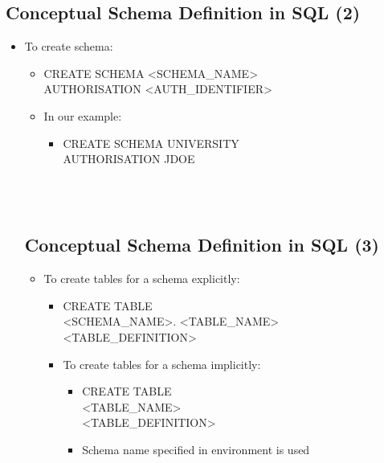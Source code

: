 \documentclass[12pt]{article}
\begin{document}
\begin{itemize}
\section{Conceptual Schema Definition in SQL (2)}
\begin{itemize}
  \item To create schema:\\ 
\begin{itemize}
  \item CREATE SCHEMA <SCHEMA_NAME>\\ 
AUTHORISATION <AUTH_IDENTIFIER>\\ 
\end{itemize}
\begin{itemize}
  \item In our example:\\ 
\begin{itemize}
  \item CREATE SCHEMA UNIVERSITY\\ 
AUTHORISATION JDOE\\ 
\end{itemize}
\end{itemize}
\\ 
 \\ 
\section{Conceptual Schema Definition in SQL (3)}
\begin{itemize}
  \item To create tables for a schema explicitly:\\ 
\begin{itemize}
  \item CREATE TABLE\\ 
<SCHEMA_NAME>. <TABLE_NAME> \\ 
<TABLE_DEFINITION>\\ 
\end{itemize}
\begin{itemize}
  \item To create tables for a schema implicitly:\\ 
\begin{itemize}
  \item CREATE TABLE\\ 
<TABLE_NAME>\\ 
<TABLE_DEFINITION>\\ 
  \item Schema name specified in environment is used\\ 
\end{itemize}
\end{itemize}
\\ 
 \\ 

\end{itemize}
\end{itemize}
\end{itemize}
\end{document}
